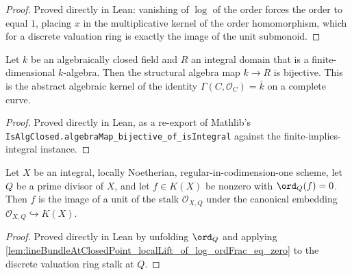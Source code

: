 \begin{proof}
  Proved directly in Lean: vanishing of \(\log\) of the order forces the
  order to equal \(1\), placing \(x\) in the multiplicative kernel of the
  order homomorphism, which for a discrete valuation ring is exactly the
  image of the unit submonoid.
\end{proof}

\begin{lemma}
  \label{lem:lineBundleAtClosedPoint_algebraMap_bijective_of_finite_isDomain_isAlgClosed}
  Let \(k\) be an algebraically closed field and \(R\) an integral domain that
  is a finite-dimensional \(k\)-algebra. Then the structural algebra map
  \(k \to R\) is bijective. This is the abstract algebraic kernel of the
  identity \(\Gamma(C, \mathcal O_C) = \bar k\) on a complete curve.
\end{lemma}

\begin{proof}
  Proved directly in Lean, as a re-export of Mathlib's
  \texttt{IsAlgClosed.algebraMap\_bijective\_of\_isIntegral} against the
  finite-implies-integral instance.
\end{proof}

\begin{lemma}
  \label{lem:lineBundleAtClosedPoint_functionField_localUnit_of_orderZero_at_primeDivisor}
  Let \(X\) be an integral, locally Noetherian, regular-in-codimension-one
  scheme, let \(Q\) be a prime divisor of \(X\), and let \(f \in K(X)\) be
  nonzero with \(\ord_Q(f) = 0\). Then \(f\) is the image of a unit of the
  stalk \(\mathcal O_{X, Q}\) under the canonical embedding
  \(\mathcal O_{X, Q} \hookrightarrow K(X)\).
\end{lemma}

\begin{proof}
  Proved directly in Lean by unfolding \(\ord_Q\) and applying
  \cref{lem:lineBundleAtClosedPoint_localLift_of_log_ordFrac_eq_zero} to the
  discrete valuation ring stalk at \(Q\).
\end{proof}

